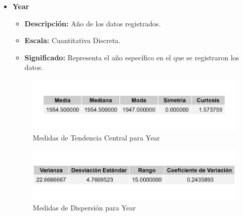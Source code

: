 \documentclass{article}
\begin{document}
\begin{itemize}
    \item \textbf{Year}
    \begin{itemize}
        \item \textbf{Descripción:} Año de los datos registrados.
        \item \textbf{Escala:} Cuantitativa Discreta.
        \item \textbf{Significado:} Representa el año específico en el que se registraron los datos.
    \end{itemize}
    \begin{figure}[H]
        \centering
        \includegraphics[width=\textwidth]{MTC/Year_central.png}
        \caption{Medidas de Tendencia Central para Year}
    \end{figure}
    \begin{figure}[H]
        \centering
        \includegraphics[width=\textwidth]{MTC/Year_dispersion.png}
        \caption{Medidas de Dispersión para Year}
    \end{figure}
    

\end{itemize}
\end{document}
